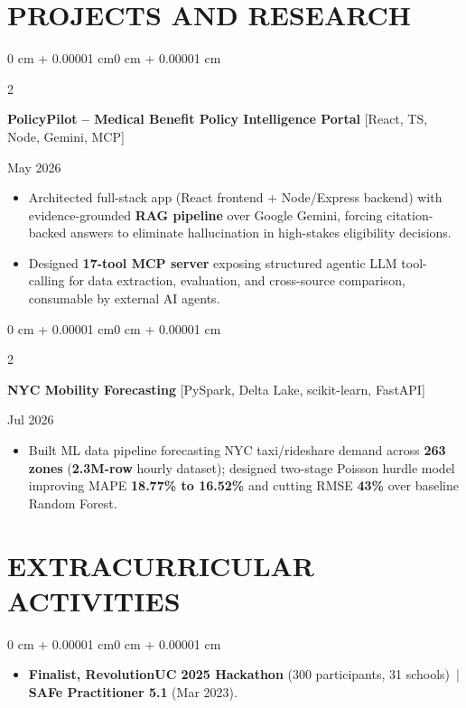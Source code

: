\documentclass[10pt, letterpaper]{article}
\newenvironment{highlights}{
    \begin{itemize}[
        topsep=0.10 cm,
        parsep=0.06 cm,
        partopsep=0pt,
        itemsep=0.06 cm,
        leftmargin=12pt
    ]
}{
    \end{itemize}
}
\newenvironment{onecolentry}{
    \begin{adjustwidth}{0 cm + 0.00001 cm}{0 cm + 0.00001 cm}
}{
    \end{adjustwidth}
}
\newenvironment{twocolentry}[2][]{
    \onecolentry
    \def\secondColumn{#2}
    \setcolumnwidth{\fill, 4.5 cm}
    \begin{paracol}{2}
}{
    \switchcolumn \raggedleft \secondColumn
    \end{paracol}
    \endonecolentry
}
\begin{document}
\section{PROJECTS AND RESEARCH}
\begin{twocolentry}{May 2026}
\textbf{PolicyPilot -- Medical Benefit Policy Intelligence Portal} [React, TS, Node, Gemini, MCP]
\end{twocolentry}
\begin{highlights}
  \item Architected full-stack app (React frontend + Node/Express backend) with evidence-grounded \textbf{RAG pipeline} over Google Gemini, forcing citation-backed answers to eliminate hallucination in high-stakes eligibility decisions.
  \item Designed \textbf{17-tool MCP server} exposing structured agentic LLM tool-calling for data extraction, evaluation, and cross-source comparison, consumable by external AI agents.
\end{highlights}

\vspace{0.12 cm}

\begin{twocolentry}{Jul 2026}
\textbf{NYC Mobility Forecasting} [PySpark, Delta Lake, scikit-learn, FastAPI]
\end{twocolentry}
\begin{highlights}
  \item Built ML data pipeline forecasting NYC taxi/rideshare demand across \textbf{263 zones} (\textbf{2.3M-row} hourly dataset); designed two-stage Poisson hurdle model improving MAPE \textbf{18.77\% to 16.52\%} and cutting RMSE \textbf{43\%} over baseline Random Forest.
\end{highlights}

\section{EXTRACURRICULAR ACTIVITIES}
\begin{onecolentry}
\begin{highlights}
  \item \textbf{Finalist, RevolutionUC 2025 Hackathon} (300 participants, 31 schools) \,|\, \textbf{SAFe Practitioner 5.1} (Mar 2023).
\end{highlights}
\end{onecolentry}
\end{document}
